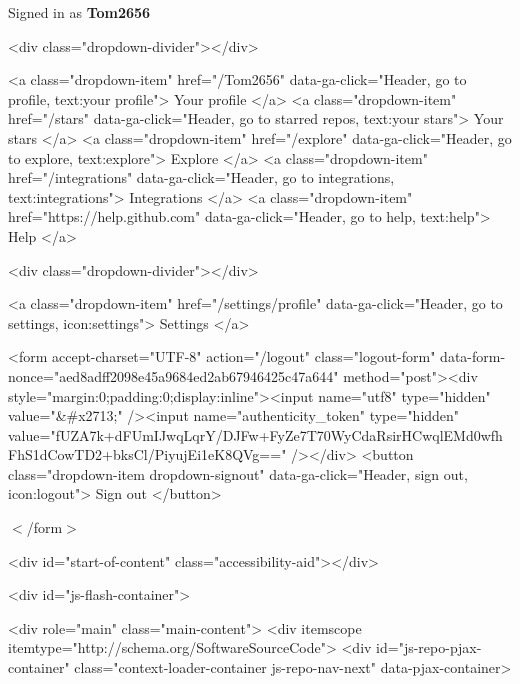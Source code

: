     Signed in as {\bfseries Tom2656}

 

\begin{DoxyVerb}    <div class="dropdown-divider"></div>

      <a class="dropdown-item" href="/Tom2656" data-ga-click="Header, go to profile, text:your profile">
        Your profile
      </a>
    <a class="dropdown-item" href="/stars" data-ga-click="Header, go to starred repos, text:your stars">
      Your stars
    </a>
      <a class="dropdown-item" href="/explore" data-ga-click="Header, go to explore, text:explore">
        Explore
      </a>
      <a class="dropdown-item" href="/integrations" data-ga-click="Header, go to integrations, text:integrations">
        Integrations
      </a>
    <a class="dropdown-item" href="https://help.github.com" data-ga-click="Header, go to help, text:help">
      Help
    </a>


      <div class="dropdown-divider"></div>

      <a class="dropdown-item" href="/settings/profile" data-ga-click="Header, go to settings, icon:settings">
        Settings
      </a>

      <form accept-charset="UTF-8" action="/logout" class="logout-form" data-form-nonce="aed8adff2098e45a9684ed2ab67946425c47a644" method="post"><div style="margin:0;padding:0;display:inline"><input name="utf8" type="hidden" value="&#x2713;" /><input name="authenticity_token" type="hidden" value="fUZA7k+dFUmIJwqLqrY/DJFw+FyZe7T70WyCdaRsirHCwqlEMd0wfhFhS1dCowTD2+bksCl/PiyujEi1eK8QVg==" /></div>
        <button class="dropdown-item dropdown-signout" data-ga-click="Header, sign out, icon:logout">
          Sign out
        </button>
\end{DoxyVerb}
 $<$/form$>$    

  

\begin{DoxyVerb}<div id="start-of-content" class="accessibility-aid"></div>

  <div id="js-flash-container">
\end{DoxyVerb}
 

\begin{DoxyVerb}<div role="main" class="main-content">
    <div itemscope itemtype="http://schema.org/SoftwareSourceCode">
<div id="js-repo-pjax-container" class="context-loader-container js-repo-nav-next" data-pjax-container>
\end{DoxyVerb}



